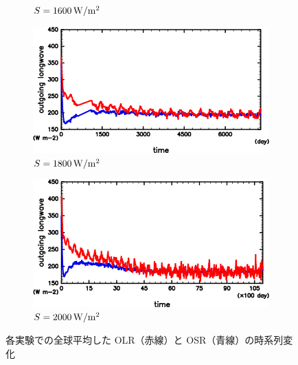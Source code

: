 \documentclass[body]{subfiles}
\begin{document}
\begin{figure}[t]
\begin{subfigure}{.4\textwidth}
		\caption{\(S=1600\hmu{W/m^2}\)}
	\end{subfigure}
	\begin{subfigure}{.4\textwidth}
		\centering
		\includegraphics[width=\columnwidth]{S1800/S1800_OLRA-OSRA_horimean_time0.0-7300.0-crop.png}
		\caption{\(S=1800\hmu{W/m^2}\)}
	\end{subfigure}
	\begin{subfigure}{.4\textwidth}
		\centering
		\includegraphics[width=\columnwidth]{S2000/S2000_OLRA-OSRA_horimean_time0.0-10950.0-crop.png}
		\caption{\(S=2000\hmu{W/m^2}\)}
	\end{subfigure}
	\caption{各実験での全球平均した OLR（赤線）と OSR（青線）の時系列変化}\label{OLR-OSR}
\end{figure}
\end{document}
